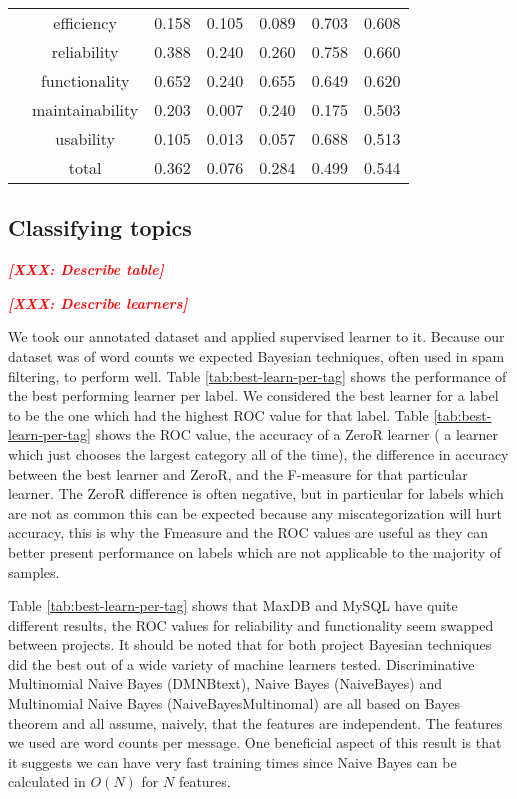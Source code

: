 \documentclass{acm_proc_article-sp}
\newcommand{\XXX}[1]{\textcolor{red}{{\it \textbf{[XXX: #1]}}}}
\begin{document}
\begin{table*}[h]
\begin{tabular}{c|c|c|c|c|c|c}
 & efficiency & 0.158 & 0.105 & 0.089 & 0.703 & 0.608 \\ 
 & reliability & 0.388 & 0.240 & 0.260 & 0.758 & 0.660 \\ 
 & functionality & 0.652 & 0.240 & 0.655 & 0.649 & 0.620 \\ 
 & maintainability & 0.203 & 0.007 & 0.240 & 0.175 & 0.503 \\ 
 & usability & 0.105 & 0.013 & 0.057 & 0.688 & 0.513 \\ 
 & total & 0.362 & 0.076 & 0.284 & 0.499 & 0.544 \\
\bottomrule
\end{tabular}
\end{table*}

\subsection{Classifying topics}

\XXX{Describe table}

\XXX{Describe learners}

We took our annotated dataset and applied supervised learner to it. Because our dataset was of word counts we expected Bayesian techniques, often used in spam filtering, to perform well.  Table \ref{tab:best-learn-per-tag} shows the performance of the best performing learner per label.  We considered the best learner for a label to be the one which had the highest ROC value for that label. Table \ref{tab:best-learn-per-tag} shows the ROC value, the accuracy of a ZeroR learner ( a learner which just chooses the largest category all of the time), the difference in accuracy between the best learner and ZeroR, and the F-measure for that particular learner. The ZeroR difference is often negative, but in particular for labels which are not as common this can be expected because any miscategorization will hurt accuracy, this is why the Fmeasure and the ROC values are useful as they can better present performance on labels which are not applicable to the majority of samples.

Table \ref{tab:best-learn-per-tag} shows that MaxDB and MySQL have quite different results, the ROC values for reliability and functionality seem swapped between projects. It should be noted that for both project Bayesian techniques did the best out of a wide variety of machine learners tested. Discriminative Multinomial Naive Bayes (DMNBtext), Naive Bayes (NaiveBayes) and Multinomial Naive Bayes (NaiveBayesMultinomal) are all based on Bayes theorem and all assume, naively, that the features are independent. The features we used are word counts per message. One beneficial aspect of this result is that it suggests we can have very fast training times since Naive Bayes can be calculated in $O(N)$ for $N$ features.
\end{document}
